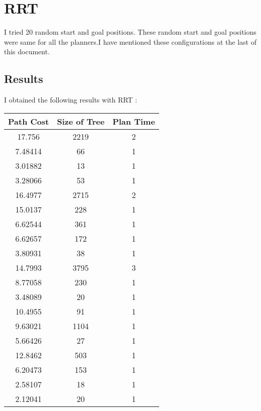 \documentclass[12pt]{article}
\begin{document}
\section{RRT}
I tried 20 random start and goal positions. These random start and goal positions were same for all the planners.I have mentioned these configurations at the last of this document.

\subsection{Results}
I obtained the following results with RRT : \\

\begin{table}[h]
\centering
\begin{tabular}{|c|c|c|}
\hline
\textbf{Path Cost} & \textbf{Size of Tree} & \textbf{Plan Time} \\ \hline
17.756    & 2219            & 2         \\ \hline
7.48414   & 66              & 1         \\ \hline
3.01882   & 13              & 1         \\ \hline
3.28066   & 53              & 1         \\ \hline
16.4977   & 2715            & 2         \\ \hline
15.0137   & 228             & 1         \\ \hline
6.62544   & 361             & 1         \\ \hline
6.62657   & 172             & 1         \\ \hline
3.80931   & 38              & 1         \\ \hline
14.7993   & 3795            & 3         \\ \hline
8.77058   & 230             & 1         \\ \hline
3.48089   & 20              & 1         \\ \hline
10.4955   & 91              & 1         \\ \hline
9.63021   & 1104            & 1         \\ \hline
5.66426   & 27              & 1         \\ \hline
12.8462   & 503             & 1         \\ \hline
6.20473   & 153             & 1         \\ \hline
2.58107   & 18              & 1         \\ \hline
2.12041   & 20              & 1         \\ \hline
\end{tabular}
\end{table}
\end{document}
